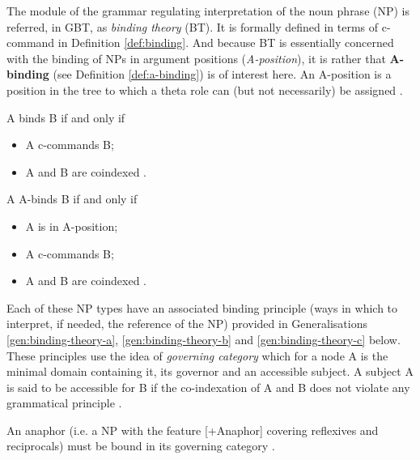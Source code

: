     The module of the grammar regulating interpretation of the noun phrase (NP) is referred, in GBT, as \textit{binding theory} (BT). It is formally defined in terms of c-command in Definition \ref{def:binding}. And because BT is essentially concerned with the binding of NPs in argument positions (\textit{A-position}), it is rather that \textbf{A-binding} (see Definition \ref{def:a-binding}) is of interest here. An A-position is a position in the tree to which a theta role can (but not necessarily) be assigned \citep[115]{Haegeman1991}.

    \begin{definition}[Binding]\label{def:binding}
        A binds B if and only if
        \begin{itemize}
            \item A c-commands B;
            \item A and B are coindexed \citep[212]{Haegeman1991}.
        \end{itemize}
    \end{definition}
    
    \begin{definition}[A-Binding]\label{def:a-binding}
        A A-binds B if and only if
        \begin{itemize}
            \item A is in A-position;
            \item A c-commands B;
            \item A and B are coindexed \citep[240]{Haegeman1991}.
        \end{itemize}
    \end{definition}

    Each of these NP types have an associated binding principle (ways in which to interpret, if needed, the reference of the NP) provided in Generalisations \ref{gen:binding-theory-a}, \ref{gen:binding-theory-b} and \ref{gen:binding-theory-c} below. These principles use the idea of \textit{governing category} which for a node A is the minimal domain containing it, its governor and an accessible subject. A subject A is said to be accessible for B if the co-indexation of A and B does not violate any grammatical principle \citep[241]{Haegeman1991}.

    \begin{generalization}\label{gen:binding-theory-a}
        An anaphor (i.e. a NP with the feature [+Anaphor] covering reflexives and reciprocals) must be bound in its governing category \citep[224]{Haegeman1991}.
    \end{generalization}
    
